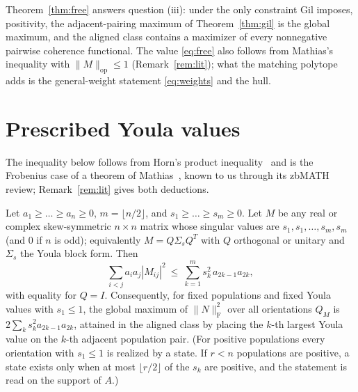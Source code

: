 \documentclass[11pt]{article}
\newcommand{\F}{\mathrm F}
\newcommand{\op}{\mathrm{op}}
\begin{document}
Theorem~\ref{thm:free} answers question (iii): under the only constraint Gil
imposes, positivity, the adjacent-pairing maximum of Theorem~\ref{thm:gil} is
the global maximum, and the aligned class contains a maximizer of every
nonnegative pairwise coherence functional. The value \eqref{eq:free} also
follows from Mathias's inequality with $\|M\|_\op\le1$ (Remark~\ref{rem:lit});
what the matching polytope adds is the general-weight statement
\eqref{eq:weights} and the hull.

\section{Prescribed Youla values}

The inequality below follows from Horn's product inequality~\cite{horn50}
and is the Frobenius case of a theorem of Mathias~\cite{mathias}, known to
us through its zbMATH review; Remark~\ref{rem:lit} gives both deductions.

\begin{theorem}\label{thm:prescribed}
Let $a_1\ge\dots\ge a_n\ge0$, $m=\lfloor n/2\rfloor$, and $s_1\ge\dots\ge s_m\ge0$.
Let $M$ be any real or complex skew-symmetric $n\times n$ matrix whose singular
values are $s_1,s_1,\dots,s_m,s_m$ (and $0$ if $n$ is odd); equivalently
$M=Q\Sigma_sQ^T$ with $Q$ orthogonal or unitary and $\Sigma_s$ the Youla block
form. Then
\begin{equation}\label{eq:prescribed}
\sum_{i<j}a_ia_j|M_{ij}|^2\ \le\ \sum_{k=1}^{m}s_k^2\,a_{2k-1}a_{2k},
\end{equation}
with equality for $Q=I$. Consequently, for fixed populations and fixed Youla
values with $s_1\le1$, the global maximum of $\|N\|_\F^2$ over all
orientations $Q_M$ is $2\sum_ks_k^2a_{2k-1}a_{2k}$, attained in the aligned
class by placing the $k$-th largest Youla value on the $k$-th adjacent
population pair. (For positive populations every orientation with $s_1\le1$
is realized by a state. If $r<n$ populations are positive, a state exists only
when at most $\lfloor r/2\rfloor$ of the $s_k$ are positive, and the
statement is read on the support of $A$.)
\end{theorem}
\end{document}
